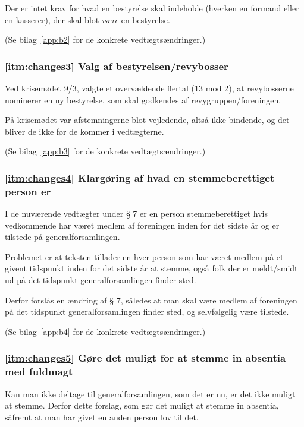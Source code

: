 \documentclass[a4paper,11pt]{report}
\begin{document}
Der er intet krav for hvad en bestyrelse skal indeholde (hverken en
formand eller en kasserer), der skal blot \emph{være} en bestyrelse.

(Se bilag~\ref{app:b2} for de konkrete vedtægtsændringer.)

\subsubsection*{\ref{itm:changes3} Valg af bestyrelsen/revybosser}

Ved krisemødet 9/3, valgte et overvældende flertal (13 mod 2), at
revybosserne nominerer en ny bestyrelse, som skal godkendes af
revygruppen/foreningen.

På krisemødet var afstemningerne blot vejledende, altså ikke
bindende, og det bliver de ikke før de kommer i vedtægterne.

(Se bilag~\ref{app:b3} for de konkrete vedtægtsændringer.)

\subsubsection*{\ref{itm:changes4} Klargøring af hvad en stemmeberettiget
person er}

I de nuværende vedtægter under § 7 er en person stemmeberettiget hvis
vedkommende har været medlem af foreningen inden for det sidste år og er
tilstede på generalforsamlingen.

Problemet er at teksten tillader en hver person som har været medlem på
et givent tidspunkt inden for det sidste år at stemme, også folk der er
meldt/smidt ud på det tidspunkt generalforsamlingen finder sted.

Derfor forslås en ændring af § 7, således at man skal være medlem af
foreningen på det tidspunkt generalforsamlingen finder sted, og
selvfølgelig være tilstede.

(Se bilag~\ref{app:b4} for de konkrete vedtægtsændringer.)

\subsubsection*{\ref{itm:changes5} Gøre det muligt for at stemme in absentia
med fuldmagt}

Kan man ikke deltage til generalforsamlingen, som det er nu, er det
ikke muligt at stemme.  Derfor dette forslag, som gør det muligt at
stemme in absentia, såfremt at man har givet en anden person lov
til det.
\end{document}
